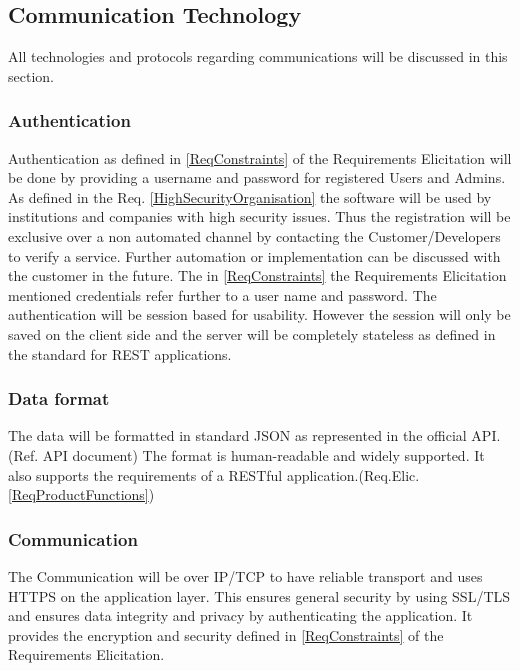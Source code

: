 \documentclass[a4paper,11pt]{article}
\begin{document}
\subsection{Communication Technology}
All technologies and protocols regarding communications will be discussed in this section. 

\subsubsection{Authentication}
Authentication as defined in \ref{ReqConstraints} of the Requirements Elicitation will be done by providing a username and password for registered Users and Admins. As defined in the Req. \ref{HighSecurityOrganisation} the software will be used by institutions and companies with high security issues. Thus the registration will be exclusive over a non automated channel by contacting the Customer/Developers to verify a service. Further automation or implementation can be discussed with the customer in the future. The in \ref{ReqConstraints} the Requirements Elicitation mentioned credentials refer further to a user name and password.
The authentication will be session based for usability. However the session will only be saved on the client side and the server will be completely stateless as defined in the standard for REST applications.

\subsubsection{Data format}
The data will be formatted in standard JSON as represented in the official API. (Ref. API document) The format is human-readable and widely supported. It also supports the requirements of a RESTful application.(Req.Elic. \ref{ReqProductFunctions})

\subsubsection{Communication}
The Communication will be over IP/TCP to have reliable transport and uses HTTPS on the application layer. This ensures general security by using SSL/TLS and ensures data integrity and privacy by authenticating the application. It provides the encryption and security defined in \ref{ReqConstraints} of the Requirements Elicitation.
\end{document}
